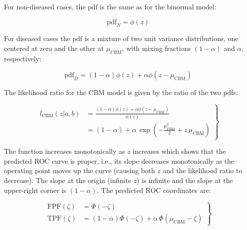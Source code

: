\documentclass[
]{book}
\begin{document}
For non-diseased cases, the \(\text{pdf}\) is the same as for the binormal model:

\begin{equation}
\text{pdf}_N=\phi(z) 
\label{eq:proper-roc-models-cbm-pdfn}
\end{equation}

For diseased cases the \(\text{pdf}\) is a mixture of two unit variance distributions, one centered at zero and the other at \(\mu_\text{CBM}\), with mixing fractions \((1-\alpha)\) and \(\alpha\), respectively:

\begin{equation}
\text{pdf}_D=\left( 1-\alpha \right)\phi(z) + \alpha \phi(z-\mu_\text{CBM})
\label{eq:proper-roc-models-cbm-pdfd}
\end{equation}

The likelihood ratio for the CBM model is given by the ratio of the two pdfs:

\begin{equation}
\left.\begin{aligned}
l_\text{CBM}\left( z|a,b \right)&=\frac{\left( 1-\alpha \right)\phi(z) + \alpha \phi(z-\mu_\text{CBM})}{\phi(z)}\\
&=\left( 1-\alpha \right)+\alpha \, \exp\left(-\frac{\mu_\text{CBM}^2}{2}+z\,\mu_\text{CBM}  \right)
\end{aligned}\right\}
\label{eq:proper-roc-models-cbm-likelihood}
\end{equation}

The function increases monotonically as \(z\) increases which shows that the predicted ROC curve is proper, i.e., its slope decreases monotonically as the operating point moves up the curve (causing both \(z\) and the likelihood ratio to decrease). The slope at the origin (infinite \(z\)) is infinite and the slope at the upper-right corner is \((1-\alpha)\). The predicted ROC coordinates are:

\begin{equation}
\left.\begin{aligned}
\text{FPF}\left( \zeta \right) &= \Phi\left( -\zeta \right)\\
\text{TPF}\left( \zeta \right) &= \left( 1-\alpha \right)\Phi\left( -\zeta \right)+\alpha \,\Phi\left( \mu_\text{CBM}-\zeta \right)
\end{aligned}\right\}
\label{eq:proper-roc-models-cbm-fpf-tpf}
\end{equation}
\end{document}
